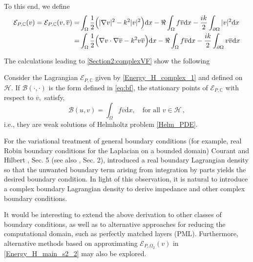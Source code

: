 \documentclass[twoside,11pt]{article}
\def\d{{\mathrm d}}
\def\C{{\mathbb C}}
\def\vbar{\overline{v}}
\def\Bc{{\mathcal B}}
\def\Hc{{\mathscr H}}
\begin{document}
{To this end, we  define 
\begin{equation}\label{Energy_H_complex_1}
\begin{split}
\mathcal{E}_{P, \C } (v) = \mathcal{E}_{P, \C } (v,  \overline{v}) =  &\int_{ \Omega    }  \frac12  \Bigl(    |\nabla v |^2 - k^2|v|^2 \Bigr)   \d x  -     \Re \int_{\Omega   } f   \overline{v}   \d  x   - \frac{ik}{2}\int_{\partial \Omega}|v|^2 \d x  \\
 =  &\int_{ \Omega    }  \frac12  \Bigl(    \nabla v\cdot \nabla \vbar  - k^2v \vbar \Bigr)   \d x  -     \Re \int_{\Omega   } f   \overline{v}   \d  x   - \frac{ik}{2}\int_{\partial \Omega}v \vbar \d x  
\end{split}\end{equation} 
 


The calculations leading to \eqref{Section2:complexVF} show the following

\begin{proposition}
 Consider the Lagrangian $\mathcal{E}_{P, \C }$ given by \eqref{Energy_H_complex_1} and defined on $\Hc$.
If $ \Bc(\cdot ,\cdot) $ is the  form defined in \eqref{eq:bf}, the stationary points of $\mathcal{E}_{P, \C }$ with respect to $\vbar,$  
 satisfy, 
 \begin{equation*}   \label{eq:bf_new}
  \Bc(u,v) = \int_{\Omega   } f   \overline{v}   \d  x, \quad \text{for all } v\in \Hc\, , 
\end{equation*}
 i.e., they are weak solutions of    
 Helmholtz problem \eqref{Helm_PDE}.   
\end{proposition}

\begin{remark} 
For the variational treatment of general boundary conditions (for example, real Robin boundary conditions for the Laplacian on a bounded domain) Courant and Hilbert \cite{CH1953}, Sec. 5 (see also \cite{C1943}, Sec. 2), introduced a real boundary Lagrangian density so that the unwanted boundary term arising from integration by parts yields the desired boundary condition. In light of this observation, it is natural to introduce a complex boundary Lagrangian density to derive impedance and other complex boundary conditions.
\end{remark}

\begin{remark} 
It would be interesting to extend the above derivation to other classes of boundary conditions, as well as to alternative approaches for reducing the computational domain, such as perfectly matched layers (PML). Furthermore, alternative methods based on approximating $\mathcal{E}_{P, \Omega _{2}}(v)$ in \eqref{Energy_H_main_s2_2} may also be explored.  
\end{remark}



}
\end{document}
